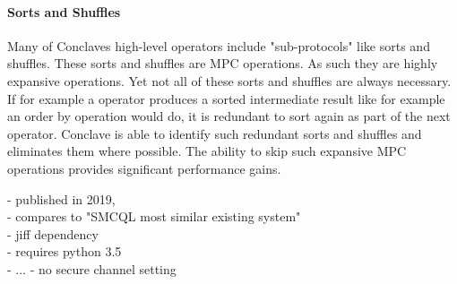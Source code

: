 \paragraph{Sorts and Shuffles}
Many of Conclaves high-level operators include "sub-protocols" like sorts and shuffles. These sorts and shuffles are MPC operations. As such they are highly expansive operations. Yet not all of these sorts and shuffles are always necessary. If for example a operator produces a sorted intermediate result like for example an order by operation would do, it is redundant to sort again as part of the next operator. Conclave is able to identify such redundant sorts and shuffles and eliminates them where possible. The ability to skip such expansive MPC operations provides significant performance gains.




- published in 2019,\\
- compares to "SMCQL most similar existing system"\\
- jiff dependency \\
- requires python 3.5 \\
- ... 
- no secure channel setting\\
